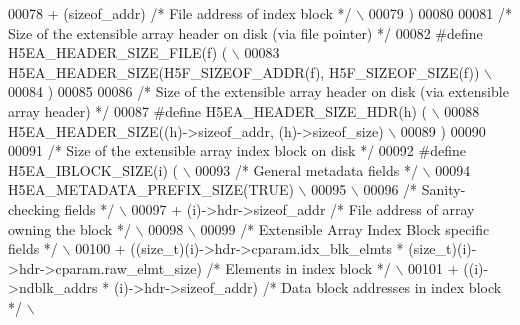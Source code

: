 \begin{DoxyCode}
00078 \textcolor{preprocessor}{    + (sizeof\_addr) }\textcolor{comment}{/* File address of index block */}\textcolor{preprocessor}{                 \(\backslash\)}
00079 \textcolor{preprocessor}{    )}
00080 
00081 \textcolor{comment}{/* Size of the extensible array header on disk (via file pointer) */}
00082 \textcolor{preprocessor}{#define H5EA\_HEADER\_SIZE\_FILE(f)   (                                          \(\backslash\)}
00083 \textcolor{preprocessor}{    H5EA\_HEADER\_SIZE(H5F\_SIZEOF\_ADDR(f), H5F\_SIZEOF\_SIZE(f))                  \(\backslash\)}
00084 \textcolor{preprocessor}{    )}
00085 
00086 \textcolor{comment}{/* Size of the extensible array header on disk (via extensible array header) */}
00087 \textcolor{preprocessor}{#define H5EA\_HEADER\_SIZE\_HDR(h)   (                                           \(\backslash\)}
00088 \textcolor{preprocessor}{    H5EA\_HEADER\_SIZE((h)->sizeof\_addr, (h)->sizeof\_size)                      \(\backslash\)}
00089 \textcolor{preprocessor}{    )}
00090 
00091 \textcolor{comment}{/* Size of the extensible array index block on disk */}
00092 \textcolor{preprocessor}{#define H5EA\_IBLOCK\_SIZE(i)     (                                             \(\backslash\)}
00093 \textcolor{preprocessor}{    }\textcolor{comment}{/* General metadata fields */}\textcolor{preprocessor}{                                             \(\backslash\)}
00094 \textcolor{preprocessor}{    H5EA\_METADATA\_PREFIX\_SIZE(TRUE)                                           \(\backslash\)}
00095 \textcolor{preprocessor}{                                                                              \(\backslash\)}
00096 \textcolor{preprocessor}{    }\textcolor{comment}{/* Sanity-checking fields */}\textcolor{preprocessor}{                                              \(\backslash\)}
00097 \textcolor{preprocessor}{    + (i)->hdr->sizeof\_addr          }\textcolor{comment}{/* File address of array owning the block */}\textcolor{preprocessor}{ \(\backslash\)}
00098 \textcolor{preprocessor}{                                                                              \(\backslash\)}
00099 \textcolor{preprocessor}{    }\textcolor{comment}{/* Extensible Array Index Block specific fields */}\textcolor{preprocessor}{                        \(\backslash\)}
00100 \textcolor{preprocessor}{    + ((size\_t)(i)->hdr->cparam.idx\_blk\_elmts * (size\_t)(i)->hdr->cparam.raw\_elmt\_size) }\textcolor{comment}{/* Elements in
       index block  */}\textcolor{preprocessor}{ \(\backslash\)}
00101 \textcolor{preprocessor}{    + ((i)->ndblk\_addrs * (i)->hdr->sizeof\_addr) }\textcolor{comment}{/* Data block addresses in index block  */}\textcolor{preprocessor}{ \(\backslash\)}

\end{DoxyCode}
